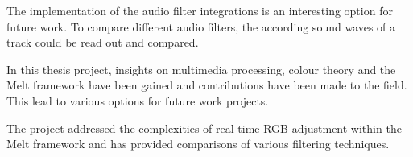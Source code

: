 \documentclass[../MasterThesis.tex]{subfiles}
\begin{document}
The implementation of the audio filter integrations is an interesting option for future work. To compare different audio filters, the according sound waves of a track could be read out and compared.




In this thesis project, insights on multimedia processing, colour theory and the Melt framework have been gained and contributions have been made to the field. This lead to various options for future work projects.

The project addressed the complexities of real-time RGB adjustment within the Melt framework and has provided comparisons of various filtering techniques. 


	
	
\end{document}
